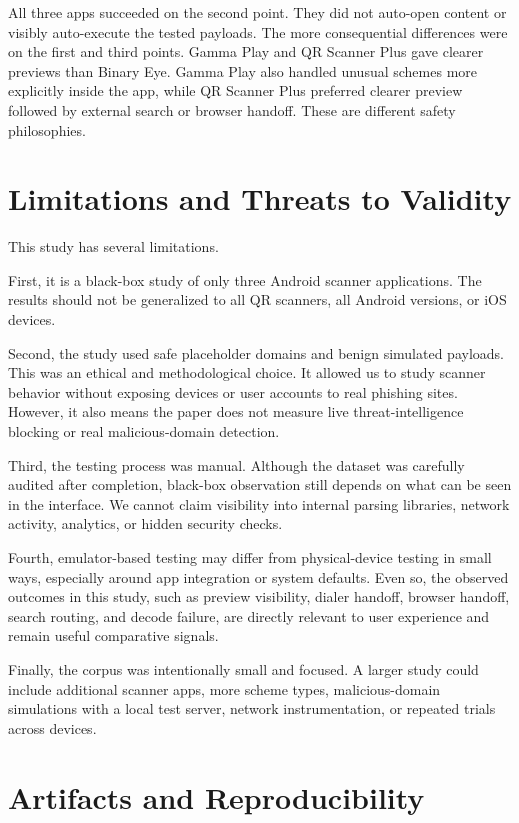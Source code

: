 \documentclass[11pt]{article}
\begin{document}
All three apps succeeded on the second point. They did not auto-open content or visibly auto-execute the tested payloads. The more consequential differences were on the first and third points. Gamma Play and QR Scanner Plus gave clearer previews than Binary Eye. Gamma Play also handled unusual schemes more explicitly inside the app, while QR Scanner Plus preferred clearer preview followed by external search or browser handoff. These are different safety philosophies.

\section{Limitations and Threats to Validity}

This study has several limitations.

First, it is a black-box study of only three Android scanner applications. The results should not be generalized to all QR scanners, all Android versions, or iOS devices.

Second, the study used safe placeholder domains and benign simulated payloads. This was an ethical and methodological choice. It allowed us to study scanner behavior without exposing devices or user accounts to real phishing sites. However, it also means the paper does not measure live threat-intelligence blocking or real malicious-domain detection.

Third, the testing process was manual. Although the dataset was carefully audited after completion, black-box observation still depends on what can be seen in the interface. We cannot claim visibility into internal parsing libraries, network activity, analytics, or hidden security checks.

Fourth, emulator-based testing may differ from physical-device testing in small ways, especially around app integration or system defaults. Even so, the observed outcomes in this study, such as preview visibility, dialer handoff, browser handoff, search routing, and decode failure, are directly relevant to user experience and remain useful comparative signals.

Finally, the corpus was intentionally small and focused. A larger study could include additional scanner apps, more scheme types, malicious-domain simulations with a local test server, network instrumentation, or repeated trials across devices.

\section{Artifacts and Reproducibility}
\end{document}
